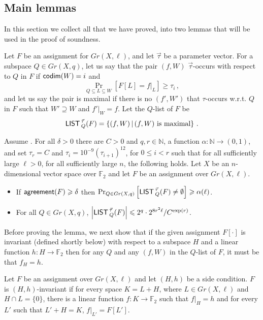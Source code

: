 \documentclass{toc}
\newcommand\card[1]{\left| {#1} \right|}
\newcommand\Prob[2]{{\Pr_{#1}\left[ {#2} \right]}}
\newcommand\Set[2]{ \left\{ #1 \,  \vert  \, #2\right\} }
\newcommand*\codimm{{\sf codim}}
\renewcommand\ge{\geqslant}
\renewcommand\le{\leqslant}
\renewcommand\supset{\supseteq}
\def\M{{\sf LIST\,}}
\def\F{\mathbb{F}}
\def\agr{{\sf agreement}}
\begin{document}
\subsection{Main lemmas}

In this section we collect all that we have proved, into two lemmas that will be used in the proof of soundness.

\begin{definition}[Q - List]\label{def:Qlist}
  Let $F$ be an assignment for $Gr(X,\ell)$, and let $\vec\tau$ be a
  parameter vector. For a subspace $Q\in Gr(X,q)$, let us say that the
  pair $(f,W)$ $\vec\tau$-occurs with respect to $Q$ in $F$ if $\codimm(W)=i$ and
\[\Prob{Q\subseteq L\subseteq W}{F[L]=f|_L} \ge \tau_i\,,
\] and let us say the pair is maximal if there is no $(f',W')$ that
$\tau$-occurs w.r.t. $Q$ in $F$ such that  $W'\supset W$ and $f'|_W=f$.
Let the $Q$-list of $F$ be \[ \M_Q^{\vec\tau}(F) = \Set{ (f,W)}{(f,W)\hbox{ is maximal}}\,.\]
\end{definition}





\begin{lemma}\label{lemma:encaps}
Assume . For all $\delta>0$ there are
%
$C>0$ and $q,r\in \mathbb{N}$, a function $\alpha\colon\mathbb{N}\to(0,1)$, and set $\tau_r = C$ and $\tau_i = 10^{-9} (\tau_{i+1})^{12}$, for $0\le i < r$ such that for all sufficiently large $\ell>0$, for all sufficiently large $n$, the following holds. Let $X$ be an $n$-dimensional vector space over $\F_2$ and let $F$ be an assignment over $Gr(X,\ell)$.
\begin{itemize}
\item  If $\agr(F)\ge \delta$ then $\Prob{Q\in Gr(X,q)}{\M^{\vec\tau}_Q(F)\neq\emptyset} \ge \alpha(\ell)$.
%
\item For all
%
$Q\in Gr(X,q)$,%
%
$\card{\M^{\vec\tau}_Q(F)} \le 2^q \cdot 2^{8r^2\ell}/C^{\exp(r)}$.  %
\end{itemize}
\end{lemma}
Before proving the lemma, we next show that if the given assignment $F[\cdot]$ is invariant (defined shortly below) with respect to a subspace $H$ and a linear function $h:H\to\F_2$ then for any $Q$ and any $(f,W)$ in the $Q$-list of $F$, it must be that $f_H=h$.

%
\begin{definition}\label{def:max-pair}  %
Let $F$ be an assignment over $Gr(X,\ell)$ and let $(H,h)$ be a side condition. $F$ is $(H,h)$-invariant if for every space $K=L+H$, where $L\in Gr(X,\ell)$ and $H\cap L=\{0\}$, there is a linear function $f:K\to\F_2$ such that $f|_H=h$ and for every $L'$ such that $L'+H=K$, $f|_{L'} = F[L']$.
\end{definition}
\end{document}
